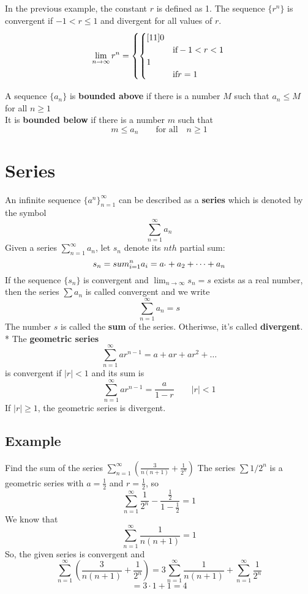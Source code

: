 In the previous example, the constant $r$ is defined as 1. The sequence $\{r^n\}$ is convergent if $-1 < r\leq 1$ and divergent for all values of $r$.
\begin{equation}
    \lim_{n\rightarrow\infty}r^n = \left\{\begin{cases}[11]
        0\cr &\text{if} -1 < r < 1\\
        1\cr& \text{if}  r = 1
    \end{cases}\right.
\end{equation}

A sequence $\{a_n\}$ is \textbf{bounded above} if there is a number $M$ such that $a_n\leq M$ \qquad for all $n\geq 1$\\
It is \textbf{bounded below} if there is a number $m$ such that $$m\leq a_n\qquad \text{for all}\quad n\geq 1$$

\section{Series}
An infinite sequence $\{a^n\}^\infty_{n=1}$ can be described as a \textbf{series} which is denoted by the symbol
$$\sum^\infty_{n = 1}a_n$$
Given a series $\textstyle\sum^\infty_{n = 1} a_n$, let $s_n$ denote its $nth$ partial sum:
$$s_n =sum^n_{i = 1}a_i = a_` + a_2 + \dots + a_n$$
If the sequence $\{s_n\}$ is convergent and $\lim_{n\rightarrow\infty}s_n = s$ exists as a real number, then the series $\textstyle\sum a_n$ is called convergent and we write
$$\sum^\infty_{n = 1}a_n = s$$ The number $s$ is called the \textbf{sum} of the series. Otheriwse, it's called \textbf{divergent}.\\*
The \textbf{geometric series} $$\sum^\infty_{n = 1}ar^{n-1} = a + ar + ar^2 + \dots$$ is convergent if $\lvert r\vert < 1$ and its sum is 
$$\sum^\infty_{n = 1}ar^{n - 1} = \frac{a}{1 - r}\qquad |r| < 1$$ If $|r|\geq 1$, the geometric series is divergent.
\subsection*{Example}
Find the sum of the series $\sum^\infty_{n = 1} (\frac{3}{n(n+1)} + \frac{1}{2^n})$
The series $\textstyle\sum 1/2^n$ is a geometric series with $a = \frac{1}{2}$ and $r = \frac{1}{2}$, so 
$$\sum^\infty_{n = 1} \frac{1}{2^n} - \frac{\frac{1}{2}}{1 - \frac{1}{2}} = 1$$
We know that $$\sum^\infty_{n = 1} \frac{1}{n(n+1)} = 1$$
So, the given series is convergent and 
$$\sum^\infty_{n = 1}(\frac{3}{n(n+1)} + \frac{1}{2^n}) = 3\sum^\infty_{n = 1}\frac{1}{n(n+1)} + \sum^\infty_{n = 1}\frac{1}{2^n}$$
$$= 3\cdot 1+ 1 = 4$$

